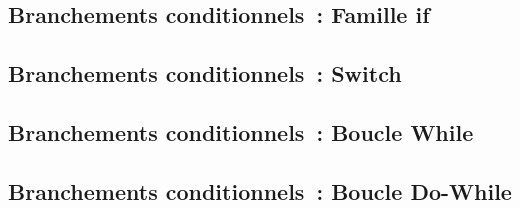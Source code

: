 \subsection*{Branchements conditionnels~: Famille if}

























\subsection*{Branchements conditionnels~: Switch}
















\subsection*{Branchements conditionnels~: Boucle While}







\subsection*{Branchements conditionnels~: Boucle Do-While}



